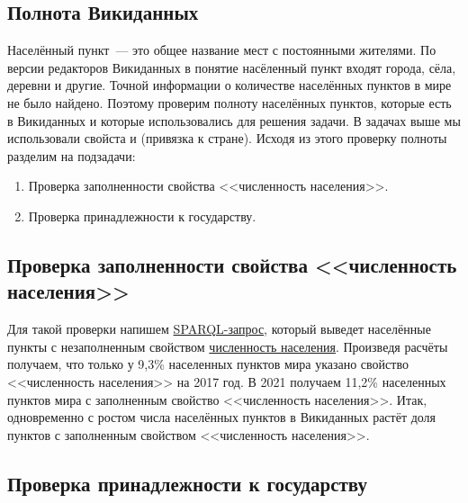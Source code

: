 \subsection{Полнота Викиданных}

Населённый пункт~--- это общее название мест с постоянными жителями\autocite{Humansettlements_Dictionary}. 
По версии редакторов Викиданных в понятие насёленный пункт входят города, сёла, деревни 
и другие.
Точной информации о количестве населённых пунктов в мире не было найдено. 
Поэтому проверим полноту населённых пунктов, которые есть в Викиданных 
и которые использовались для решения задачи. 
В задачах выше мы использовали свойста  и 
 (привязка к стране). 
Исходя из этого проверку полноты разделим на подзадачи: 
\begin{enumerate} 
  \item Проверка заполненности свойства <<численность населения>>.
  \item Проверка принадлежности к государству.
\end{enumerate}


\subsection{Проверка заполненности свойства <<численность населения>> }

Для такой проверки напишем \href{https://w.wiki/4FUz}{SPARQL-запрос}, 
который выведет населённые пункты 
с незаполненным свойством \href{http://www.wikidata.org/entity/P1082}{численность населения}. 
Произведя расчёты получаем, что только у 9,3\% населенных пунктов мира 
указано свойство <<численность населения>> на 2017 год. 
В 2021 получаем 11,2\% населенных пунктов мира с заполненным свойство <<численность населения>>. 
Итак, одновременно с ростом числа населённых пунктов в Викиданных 
растёт доля пунктов с заполненным свойством <<численность населения>>.


\subsection{Проверка принадлежности к государству}

